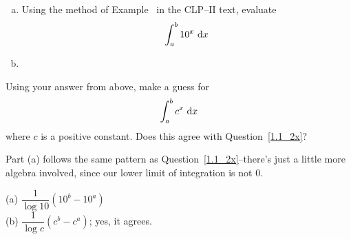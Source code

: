 \begin{question}
\begin{enumerate}[(a)]
\item Using the method of Example~ in the CLP--II text, evaluate
\[\int_a^b 10^x \ \mathrm{d}x\]
\item
\end{enumerate} Using your answer from above, make a guess for
\[\int_a^b c^x \ \mathrm{d}x\]
where $c$ is a positive constant. Does this agree with Question~\ref{1.1_2x}?
\end{question}
\begin{hint}
Part (a) follows  the same pattern as Question~\ref{1.1_2x}--there's just a little more algebra involved, since our lower limit of integration is not 0.
\end{hint}
\begin{answer}
(a) $\dfrac{1}{\log 10}\left(10^b-10^a\right)$\\
(b) $\dfrac{1}{\log c}\left(c^b-c^a\right)$; yes, it agrees.
\end{answer}
